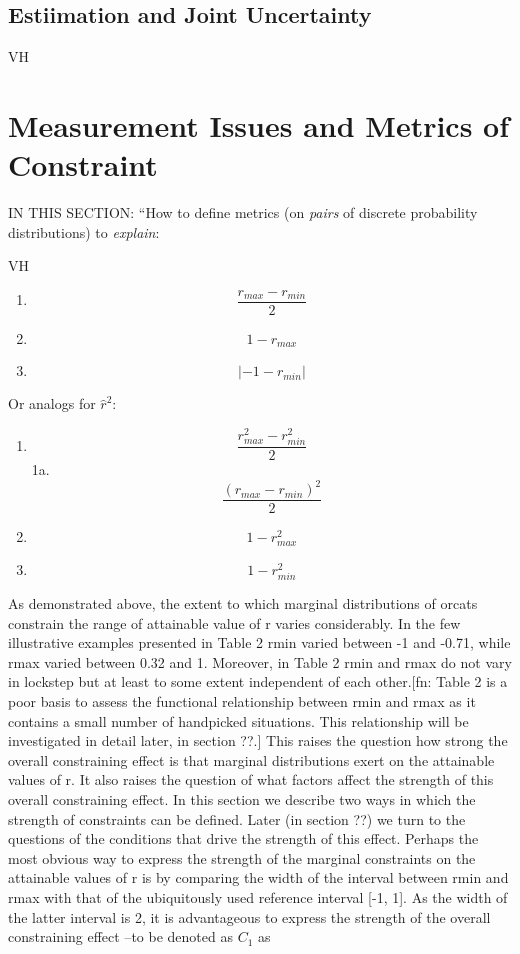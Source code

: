 \documentclass[
  12pt,
]{article}
\providecommand{\tightlist}{%
  \setlength{\itemsep}{0pt}\setlength{\parskip}{0pt}}
\theoremstyle{plain}
\theoremstyle{definition}
\theoremstyle{remark}
\begin{document}
\subsection{Estiimation and Joint
Uncertainty}\label{estiimation-and-joint-uncertainty}

VH

\section{Measurement Issues and Metrics of
Constraint}\label{sec-metrics}

IN THIS SECTION: ``How to define metrics (on \emph{pairs} of discrete
probability distributions) to \emph{explain}:

VH

\begin{enumerate}
\def\labelenumi{\arabic{enumi}.}
\tightlist
\item
  \[\frac{ r_{max}-r_{min}}{2}\]
\item
  \[1-r_{max}\]
\item
  \[|-1-r_{min}|\]
\end{enumerate}

Or analogs for \(\hat{r}^2\):

\begin{enumerate}
\def\labelenumi{\arabic{enumi}.}
\tightlist
\item
  \[\frac{ r_{max}^2-r_{min}^2}{2}\] 1a.
  \[\frac{ (r_{max}-r_{min})^2}{2}\]
\item
  \[1-r_{max}^2\]
\item
  \[1-r_{min}^2\]
\end{enumerate}

As demonstrated above, the extent to which marginal distributions of
orcats constrain the range of attainable value of r varies considerably.
In the few illustrative examples presented in Table 2 rmin varied
between -1 and -0.71, while rmax varied between 0.32 and 1. Moreover, in
Table 2 rmin and rmax do not vary in lockstep but at least to some
extent independent of each other.{[}fn: Table 2 is a poor basis to
assess the functional relationship between rmin and rmax as it contains
a small number of handpicked situations. This relationship will be
investigated in detail later, in section ??.{]} This raises the question
how strong the overall constraining effect is that marginal
distributions exert on the attainable values of r. It also raises the
question of what factors affect the strength of this overall
constraining effect. In this section we describe two ways in which the
strength of constraints can be defined. Later (in section ??) we turn to
the questions of the conditions that drive the strength of this effect.
Perhaps the most obvious way to express the strength of the marginal
constraints on the attainable values of r is by comparing the width of
the interval between rmin and rmax with that of the ubiquitously used
reference interval {[}-1, 1{]}. As the width of the latter interval is
2, it is advantageous to express the strength of the overall
constraining effect --to be denoted as \(C_1\) as
\end{document}
